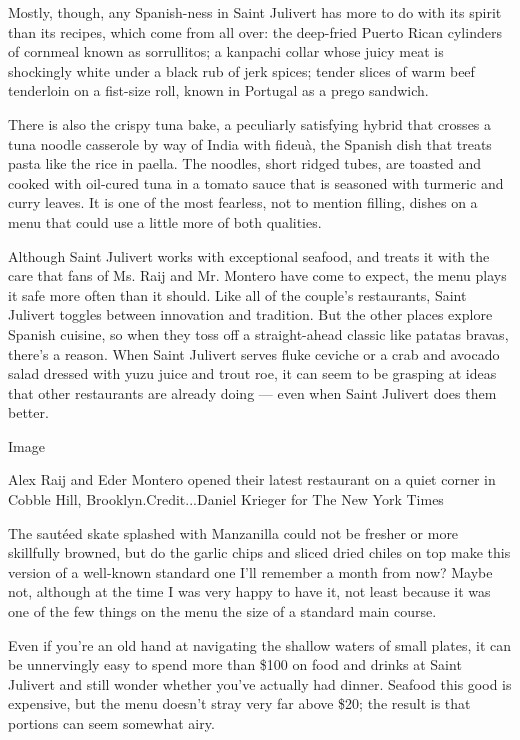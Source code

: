 Mostly, though, any Spanish-ness in Saint Julivert has more to do with
its spirit than its recipes, which come from all over: the deep-fried
Puerto Rican cylinders of cornmeal known as sorrullitos; a kanpachi
collar whose juicy meat is shockingly white under a black rub of jerk
spices; tender slices of warm beef tenderloin on a fist-size roll, known
in Portugal as a prego sandwich.

There is also the crispy tuna bake, a peculiarly satisfying hybrid that
crosses a tuna noodle casserole by way of India with fideuà, the Spanish
dish that treats pasta like the rice in paella. The noodles, short
ridged tubes, are toasted and cooked with oil-cured tuna in a tomato
sauce that is seasoned with turmeric and curry leaves. It is one of the
most fearless, not to mention filling, dishes on a menu that could use a
little more of both qualities.

Although Saint Julivert works with exceptional seafood, and treats it
with the care that fans of Ms. Raij and Mr. Montero have come to expect,
the menu plays it safe more often than it should. Like all of the
couple's restaurants, Saint Julivert toggles between innovation and
tradition. But the other places explore Spanish cuisine, so when they
toss off a straight-ahead classic like patatas bravas, there's a reason.
When Saint Julivert serves fluke ceviche or a crab and avocado salad
dressed with yuzu juice and trout roe, it can seem to be grasping at
ideas that other restaurants are already doing --- even when Saint
Julivert does them better.

Image

Alex Raij and Eder Montero opened their latest restaurant on a quiet
corner in Cobble Hill, Brooklyn.Credit...Daniel Krieger for The New York
Times

The sautéed skate splashed with Manzanilla could not be fresher or more
skillfully browned, but do the garlic chips and sliced dried chiles on
top make this version of a well-known standard one I'll remember a month
from now? Maybe not, although at the time I was very happy to have it,
not least because it was one of the few things on the menu the size of a
standard main course.

Even if you're an old hand at navigating the shallow waters of small
plates, it can be unnervingly easy to spend more than \$100 on food and
drinks at Saint Julivert and still wonder whether you've actually had
dinner. Seafood this good is expensive, but the menu doesn't stray very
far above \$20; the result is that portions can seem somewhat airy.

